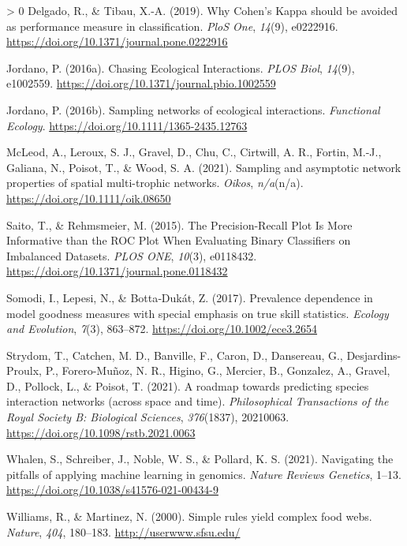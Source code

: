 \documentclass[11pt]{article}
\newlength{\cslhangindent}
\newenvironment{CSLReferences}[3] %
 {%
  \setlength{\parindent}{0pt}
  \ifodd #1 \everypar{\setlength{\hangindent}{\cslhangindent}}\ignorespaces\fi
  \ifnum #2 > 0
  \setlength{\parskip}{#2\baselineskip}
  \fi
 }%
 {}
\begin{document}
\begin{CSLReferences}{1}{0}
\leavevmode\hypertarget{ref-Delgado2019WhyCoh}{}%
Delgado, R., \& Tibau, X.-A. (2019). Why Cohen's Kappa should be avoided
as performance measure in classification. \emph{PloS One}, \emph{14}(9),
e0222916. \url{https://doi.org/10.1371/journal.pone.0222916}

\leavevmode\hypertarget{ref-Jordano2016ChaEco}{}%
Jordano, P. (2016a). Chasing Ecological Interactions. \emph{PLOS Biol},
\emph{14}(9), e1002559.
\url{https://doi.org/10.1371/journal.pbio.1002559}

\leavevmode\hypertarget{ref-Jordano2016SamNet}{}%
Jordano, P. (2016b). Sampling networks of ecological interactions.
\emph{Functional Ecology}. \url{https://doi.org/10.1111/1365-2435.12763}

\leavevmode\hypertarget{ref-McLeod2021SamAsy}{}%
McLeod, A., Leroux, S. J., Gravel, D., Chu, C., Cirtwill, A. R., Fortin,
M.-J., Galiana, N., Poisot, T., \& Wood, S. A. (2021). Sampling and
asymptotic network properties of spatial multi-trophic networks.
\emph{Oikos}, \emph{n/a}(n/a). \url{https://doi.org/10.1111/oik.08650}

\leavevmode\hypertarget{ref-Saito2015PrePlo}{}%
Saito, T., \& Rehmsmeier, M. (2015). The Precision-Recall Plot Is More
Informative than the ROC Plot When Evaluating Binary Classifiers on
Imbalanced Datasets. \emph{PLOS ONE}, \emph{10}(3), e0118432.
\url{https://doi.org/10.1371/journal.pone.0118432}

\leavevmode\hypertarget{ref-Somodi2017PreDep}{}%
Somodi, I., Lepesi, N., \& Botta‐Dukát, Z. (2017). Prevalence dependence
in model goodness measures with special emphasis on true skill
statistics. \emph{Ecology and Evolution}, \emph{7}(3), 863--872.
\url{https://doi.org/10.1002/ece3.2654}

\leavevmode\hypertarget{ref-Strydom2021RoaPre}{}%
Strydom, T., Catchen, M. D., Banville, F., Caron, D., Dansereau, G.,
Desjardins-Proulx, P., Forero-Muñoz, N. R., Higino, G., Mercier, B.,
Gonzalez, A., Gravel, D., Pollock, L., \& Poisot, T. (2021). A roadmap
towards predicting species interaction networks (across space and time).
\emph{Philosophical Transactions of the Royal Society B: Biological
Sciences}, \emph{376}(1837), 20210063.
\url{https://doi.org/10.1098/rstb.2021.0063}

\leavevmode\hypertarget{ref-Whalen2021NavPit}{}%
Whalen, S., Schreiber, J., Noble, W. S., \& Pollard, K. S. (2021).
Navigating the pitfalls of applying machine learning in genomics.
\emph{Nature Reviews Genetics}, 1--13.
\url{https://doi.org/10.1038/s41576-021-00434-9}

\leavevmode\hypertarget{ref-Williams2000SimRul}{}%
Williams, R., \& Martinez, N. (2000). Simple rules yield complex food
webs. \emph{Nature}, \emph{404}, 180--183.
\href{http://userwww.sfsu.edu/\%20}{http://userwww.sfsu.edu/}

\end{CSLReferences}
\end{document}
